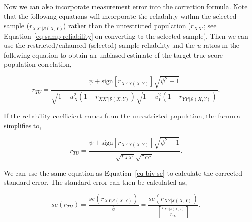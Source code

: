 \documentclass[
  letterpaper,
  DIV=11,
  numbers=noendperiod]{scrreprt}
\begin{document}
Now we can also incorporate measurement error into the correction
formula. Note that the following equations will incorporate the
reliability within the selected sample (\(r_{XX'|\mathcal{S}(X,Y)}\))
rather than the unrestricted population (\(r_{XX'}\); see
Equation~\ref{eq-samp-reliability} on converting to the selected
sample). Then we can use the restricted/enhanced (selected) sample
reliability and the \(u\)-ratios in the following equation to obtain an
unbiased estimate of the target true score population correlation,

\[
r_{TU} = \frac{\psi + \text{sign}\left[r_{XY|\mathcal{S}(X,Y)}\right]\sqrt{\psi^2+1}}{\sqrt{1-u_X^2\left(1-r_{XX'|\mathcal{S}(X,Y)}\right)}\sqrt{1-u_Y^2\left(1-r_{YY'|\mathcal{S}(X,Y)}\right)}}.
\]

If the reliability coefficient comes from the unrestricted population,
the formula simplifies to,

\[
r_{TU} = \frac{\psi + \text{sign}\left[r_{XY|\mathcal{S}(X,Y)}\right]\sqrt{\psi^2+1}}{\sqrt{r_{XX'}}\sqrt{r_{YY'}}}.
\]

We can use the same equation as Equation~\ref{eq-biv-se} to calculate
the corrected standard error. The standard error can then be calculated
as,

\[
se(r_{TU}) = \frac{se\left(r_{XY|\mathcal{S}(X,Y)}\right)}{\hat{a}}= \frac{se\left(r_{XY|\mathcal{S}(X,Y)}\right)}{\left[\frac{r_{XY|\mathcal{S}(X,Y)}}{r_{TU}}\right]}.
\]
\end{document}
